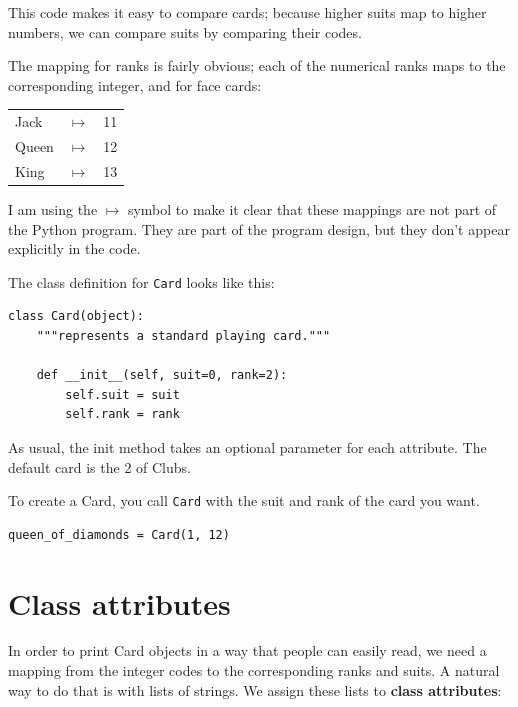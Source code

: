 \documentclass[10pt]{book}
\begin{document}
This code makes it easy to compare cards; because higher suits map to
higher numbers, we can compare suits by comparing their codes.

The mapping for ranks is fairly obvious; each of the numerical ranks
maps to the corresponding integer, and for face cards:

\beforefig
\begin{tabular}{l c l}
Jack & $\mapsto$ & 11 \\
Queen & $\mapsto$ & 12 \\
King & $\mapsto$ & 13 \\
\end{tabular}
\afterfig

I am using the $\mapsto$ symbol to make it clear that these mappings
are not part of the Python program.  They are part of the program
design, but they don't appear explicitly in the code.


The class definition for {\tt Card} looks like this:

\beforeverb
\begin{verbatim}
class Card(object):
    """represents a standard playing card."""

    def __init__(self, suit=0, rank=2):
        self.suit = suit
        self.rank = rank
\end{verbatim}
\afterverb
%
As usual, the init method takes an optional
parameter for each attribute.  The default card is
the 2 of Clubs.


To create a Card, you call {\tt Card} with the
suit and rank of the card you want.

\beforeverb
\begin{verbatim}
queen_of_diamonds = Card(1, 12)
\end{verbatim}
\afterverb
%


\section{Class attributes}


In order to print Card objects in a way that people can easily
read, we need a mapping from the integer codes to the corresponding
ranks and suits.  A natural way to
do that is with lists of strings.  We assign these lists to {\bf class
attributes}:
\end{document}

